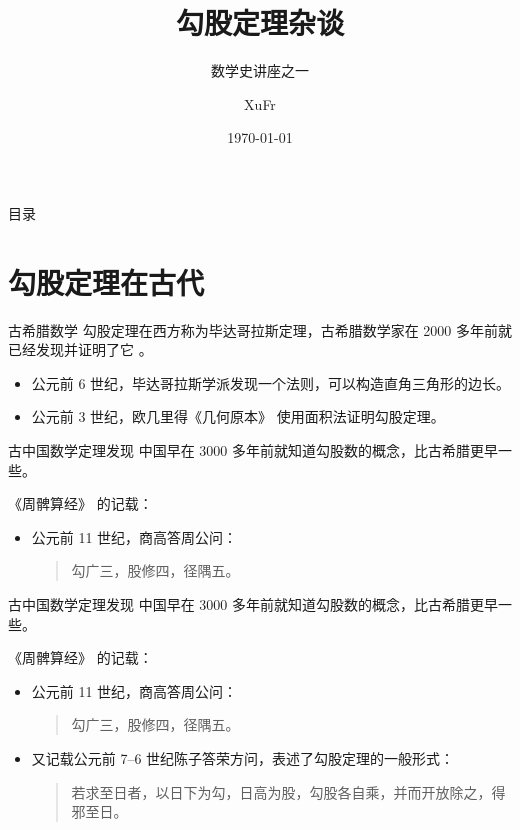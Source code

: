 \documentclass[no-math,xcolor=table]{beamer}
\title{勾股定理杂谈}
\subtitle{数学史讲座之一}
\institute{九章学堂}
\author{XuFr}
\date{\today}
\begin{document}
	\begin{frame}
		\titlepage%
	\end{frame}
	\begin{frame}{目录}
		\tableofcontents
	\end{frame}
	\section{勾股定理在古代}
	\begin{frame}{古希腊数学}
		勾股定理在西方称为毕达哥拉斯定理，古希腊数学家在 2000 多年前就已经发现并证明了它 \cite{Kline}。
		\begin{itemize}
			\item 公元前 6 世纪，毕达哥拉斯学派发现一个法则，可以构造直角三角形的边长。
			\item 公元前 3 世纪，欧几里得《几何原本》 使用面积法证明勾股定理。
		\end{itemize}
	\end{frame}
	\begin{frame}{古中国数学}{定理发现}
		中国早在 3000 多年前就知道勾股数的概念，比古希腊更早一些。
		
		《周髀算经》 的记载：
		\begin{itemize}
			\item 公元前 11 世纪，商高答周公问：
			\begin{quote}
				\zihao{-5}\kaishu
				勾广三，股修四，径隅五。
			\end{quote}
		\end{itemize}
	\end{frame}
\begin{frame}{古中国数学}{定理发现}
	中国早在 3000 多年前就知道勾股数的概念，比古希腊更早一些。
	
	《周髀算经》 的记载：
	\begin{itemize}
		\item 公元前 11 世纪，商高答周公问：
		\begin{quote}
			\kaishu
			勾广三，股修四，径隅五。
		\end{quote}
		\item 又记载公元前 7--6 世纪陈子答荣方问，表述了勾股定理的一般形式：
		\begin{quote}
			\kaishu 
			若求至日者，以日下为勾，日高为股，勾股各自乘，并而开放除之，得邪至日。
		\end{quote}
	\end{itemize}

\end{frame}
\end{document}
